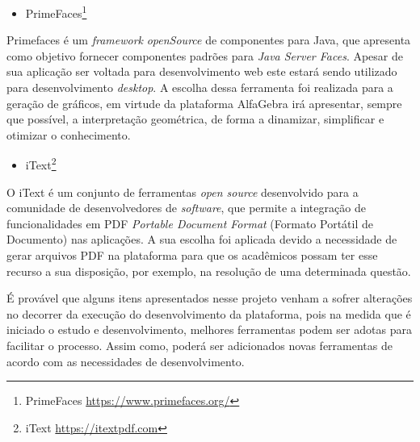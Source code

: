 \begin{itemize}
    \item PrimeFaces\footnote[15]{PrimeFaces \url{https://www.primefaces.org/}}
\end{itemize}
Primefaces é um \textit{framework} \textit{openSource} de componentes para Java, que apresenta como objetivo fornecer componentes padrões para \textit{Java Server Faces}. Apesar de sua aplicação ser voltada para desenvolvimento web este estará sendo utilizado para desenvolvimento \textit{desktop}. A escolha dessa ferramenta foi realizada para a geração de gráficos, em virtude da plataforma AlfaGebra irá apresentar, sempre que possível, a interpretação geométrica, de forma a dinamizar, simplificar e otimizar o conhecimento.

\begin{itemize}
    \item iText\footnote[16]{iText \url{https://itextpdf.com}}
\end{itemize}
O iText é um conjunto de ferramentas \textit{open source} desenvolvido para a comunidade de desenvolvedores de \textit{software}, que permite a integração de funcionalidades em PDF \textit{Portable Document Format} (Formato Portátil de Documento) nas aplicações. A sua escolha foi aplicada devido a necessidade de gerar arquivos PDF na plataforma para que os acadêmicos possam ter esse recurso a sua disposição, por exemplo, na resolução de uma determinada questão.

É provável que alguns itens apresentados nesse projeto venham a sofrer alterações no decorrer da execução do desenvolvimento da plataforma, pois na medida que é iniciado o estudo e desenvolvimento, melhores ferramentas podem ser adotas para facilitar o processo. Assim como, poderá ser adicionados novas ferramentas de acordo com as necessidades de desenvolvimento.